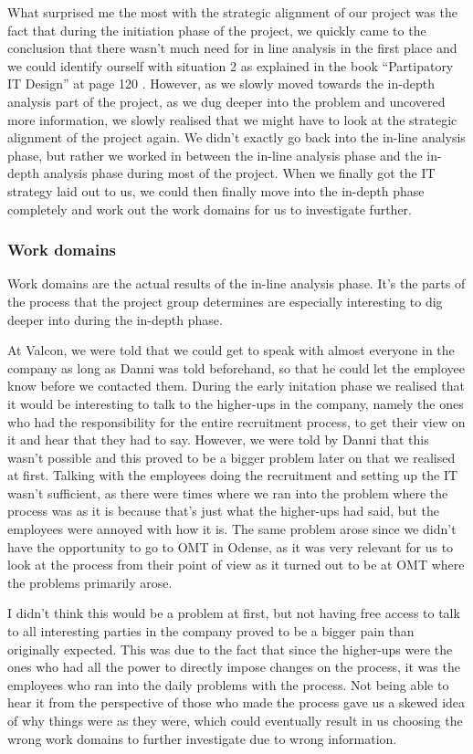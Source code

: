 What surprised me the most with the strategic alignment of our project was the fact that during the initiation phase of the project, we quickly came to the conclusion that there wasn’t much need for in line analysis in the first place and we could identify ourself with situation 2 as explained in the book “Partipatory IT Design” at page 120 . However, as we slowly moved towards the in-depth analysis part of the project, as we dug deeper into the problem and uncovered more information, we slowly realised that we might have to look at the strategic alignment of the project again.
We didn’t exactly go back into the in-line analysis phase, but rather we worked in between the in-line analysis phase and the in-depth analysis phase during most of the project. When we finally got the IT strategy laid out to us, we could then finally move into the in-depth phase completely and work out the work domains for us to investigate further.

\subsubsection{Work domains}
Work domains are the actual results of the in-line analysis phase. It’s the parts of the process that the project group determines are especially interesting to dig deeper into during the in-depth phase. 

At Valcon, we were told that we could get to speak with almost everyone in the company as long as Danni was told beforehand, so that he could let the employee know before we contacted them. During the early initation phase we realised that it would be interesting to talk to the higher-ups in the company, namely the ones who had the responsibility for the entire recruitment process, to get their view on it and hear that they had to say. However, we were told by Danni that this wasn’t possible and this proved to be a bigger problem later on that we realised at first. 
Talking with the employees doing the recruitment and setting up the IT wasn’t sufficient, as there were times where we ran into the problem where the process was as it is because that’s just what the higher-ups had said, but the employees were annoyed with how it is. The same problem arose since we didn’t have the opportunity to go to OMT in Odense, as it was very relevant for us to look at the process from their point of view as it turned out to be at OMT where the problems primarily arose.

I didn’t think this would be a problem at first, but not having free access to talk to all interesting parties in the company proved to be a bigger pain than originally expected. This was due to the fact that since the higher-ups were the ones who had all the power to directly impose changes on the process, it was the employees who ran into the daily problems with the process. Not being able to hear it from the perspective of those who made the process gave us a skewed idea of why things were as they were, which could eventually result in us choosing the wrong work domains to further investigate due to wrong information.

